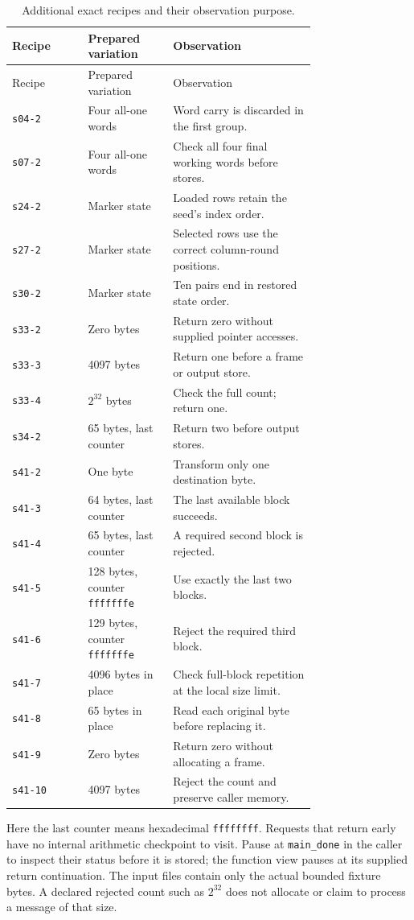\begin{longtable}{lp{0.28\linewidth}p{0.47\linewidth}}
\caption{Additional exact recipes and their observation purpose.}\\
\toprule Recipe & Prepared variation & Observation\\\midrule\endfirsthead
\toprule Recipe & Prepared variation & Observation\\\midrule\endhead
\texttt{s04-2} & Four all-one words & Word carry is discarded in the first group.\\
\texttt{s07-2} & Four all-one words & Check all four final working words before stores.\\
\texttt{s24-2} & Marker state & Loaded rows retain the seed's index order.\\
\texttt{s27-2} & Marker state & Selected rows use the correct column-round positions.\\
\texttt{s30-2} & Marker state & Ten pairs end in restored state order.\\
\texttt{s33-2} & Zero bytes & Return zero without supplied pointer accesses.\\
\texttt{s33-3} & 4097 bytes & Return one before a frame or output store.\\
\texttt{s33-4} & \(2^{32}\) bytes & Check the full count; return one.\\
\texttt{s34-2} & 65 bytes, last counter & Return two before output stores.\\
\texttt{s41-2} & One byte & Transform only one destination byte.\\
\texttt{s41-3} & 64 bytes, last counter & The last available block succeeds.\\
\texttt{s41-4} & 65 bytes, last counter & A required second block is rejected.\\
\texttt{s41-5} & 128 bytes, counter \texttt{fffffffe} & Use exactly the last two blocks.\\
\texttt{s41-6} & 129 bytes, counter \texttt{fffffffe} & Reject the required third block.\\
\texttt{s41-7} & 4096 bytes in place & Check full-block repetition at the local size limit.\\
\texttt{s41-8} & 65 bytes in place & Read each original byte before replacing it.\\
\texttt{s41-9} & Zero bytes & Return zero without allocating a frame.\\
\texttt{s41-10} & 4097 bytes & Reject the count and preserve caller memory.\\
\bottomrule
\end{longtable}

Here the last counter means hexadecimal \texttt{ffffffff}. Requests that return
early have no internal arithmetic checkpoint to visit. Pause at \texttt{main\_done}
in the caller to inspect their status before it is stored; the function view pauses
at its supplied return continuation. The input files contain only the actual bounded
fixture bytes. A declared rejected count such as \(2^{32}\) does not allocate or
claim to process a message of that size.
